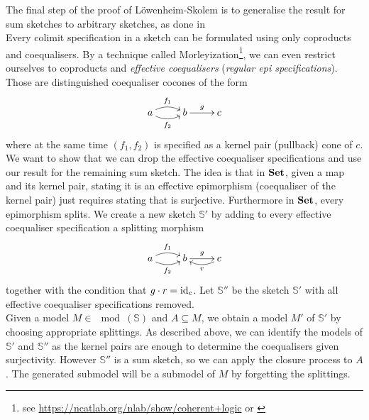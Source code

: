 The final step of the proof of Löwenheim-Skolem is to generalise the result for sum sketches to arbitrary sketches, as done in \cite[55]{MakkaiPare} \\

Every colimit specification in a sketch can be formulated using only coproducts and coequalisers. By a technique called Morleyization\footnote{see \url{https://ncatlab.org/nlab/show/coherent+logic} or \cite[\nopp~3.2.4, \nopp~3.2.7]{MakkaiPare}}, we can even restrict ourselves to coproducts and \emph{effective coequalisers} (\emph{regular epi specifications}). Those are distinguished coequaliser cocones of the form
\[
\xymatrix{
a \ar@/^/[r]^{f_1} \ar@/_/[r]_{f_2} & b \ar[r]^{g} & c
}\]
where at the same time $(f_1,f_2)$ is specified as a kernel pair (pullback) cone of $c$. \\

We want to show that we can drop the effective coequaliser specifications and use our result for the remaining sum sketch. The idea is that in $\mathbf{Set}$, given a map and its kernel pair, stating it is an effective epimorphism (coequaliser of the kernel pair) just requires stating that is surjective. Furthermore in $\mathbf{Set}$, every epimorphism splits. We create a new sketch $\mathbb S'$ by adding to every effective coequaliser specification a splitting morphism
\[
\xymatrix{
a \ar@/^/[r]^{f_1} \ar@/_/[r]_{f_2} & b \ar[r]^{g} & c \ar@/^/[l]^{r}
}\]
together with the condition that $g \cdot r = \textrm{id}_c$. Let $\mathbb S''$ be the sketch $\mathbb S'$ with all effective coequaliser specifications removed. \\

Given a model $M \in \mod(\mathbb S)$ and $A \subseteq M$, we obtain a model $M'$ of $\mathbb S'$ by choosing appropriate splittings. As described above, we can identify the models of $\mathbb S'$ and $\mathbb S''$ as the kernel pairs are enough to determine the coequalisers given surjectivity. However $\mathbb S''$ is a sum sketch, so we can apply the closure process to $A$. The generated submodel will be a submodel of $M$ by forgetting the splittings.
